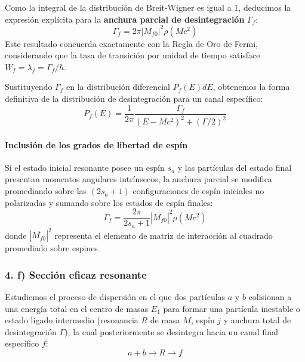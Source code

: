 Como la integral de la distribución de Breit-Wigner es igual a 1, deducimos la expresión explícita para la \textbf{anchura parcial de desintegración} $\Gamma_f$:
\begin{equation}
\Gamma_f = 2\pi |M_{f0}|^2 \rho(M c^2)
\end{equation}
Este resultado concuerda exactamente con la Regla de Oro de Fermi, considerando que la tasa de transición por unidad de tiempo satisface $W_f = \lambda_f = \Gamma_f / \hbar$.

Sustituyendo $\Gamma_f$ en la distribución diferencial $P_f(E) dE$, obtenemos la forma definitiva de la distribución de desintegración para un canal específico:
\begin{equation}
P_f(E) = \frac{1}{2\pi} \frac{\Gamma_f}{(E - M c^2)^2 + (\Gamma / 2)^2}
\end{equation}

\paragraph{Inclusión de los grados de libertad de espín}

Si el estado inicial resonante posee un espín $s_a$ y las partículas del estado final presentan momentos angulares intrínsecos, la anchura parcial se modifica promediando sobre las $(2s_a + 1)$ configuraciones de espín iniciales no polarizadas y sumando sobre los estados de espín finales:
\begin{equation}
\Gamma_f = \frac{2\pi}{2s_a + 1} |\overline{M_{f0}}|^2 \rho(M c^2)
\end{equation}
donde $|\overline{M_{f0}}|^2$ representa el elemento de matriz de interacción al cuadrado promediado sobre espines.

\newpage
\subsubsection*{4. f) Sección eficaz resonante}

Estudiemos el proceso de dispersión en el que dos partículas $a$ y $b$ colisionan a una energía total en el centro de masas $E_1$ para formar una partícula inestable o estado ligado intermedio (resonancia $R$ de masa $M$, espín $j$ y anchura total de desintegración $\Gamma$), la cual posteriormente se desintegra hacia un canal final específico $f$:
\begin{equation}
a + b \longrightarrow R \longrightarrow f
\end{equation}

